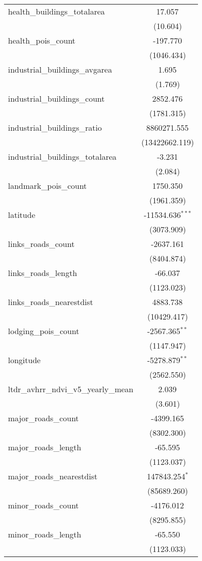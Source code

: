 \begin{table}[!htbp]
\begin{tabular}{@{\extracolsep{5pt}}lc}
 health_buildings_totalarea & 17.057$^{}$ \\
  & (10.604) \\
 health_pois_count & -197.770$^{}$ \\
  & (1046.434) \\
 industrial_buildings_avgarea & 1.695$^{}$ \\
  & (1.769) \\
 industrial_buildings_count & 2852.476$^{}$ \\
  & (1781.315) \\
 industrial_buildings_ratio & 8860271.555$^{}$ \\
  & (13422662.119) \\
 industrial_buildings_totalarea & -3.231$^{}$ \\
  & (2.084) \\
 landmark_pois_count & 1750.350$^{}$ \\
  & (1961.359) \\
 latitude & -11534.636$^{***}$ \\
  & (3073.909) \\
 links_roads_count & -2637.161$^{}$ \\
  & (8404.874) \\
 links_roads_length & -66.037$^{}$ \\
  & (1123.023) \\
 links_roads_nearestdist & 4883.738$^{}$ \\
  & (10429.417) \\
 lodging_pois_count & -2567.365$^{**}$ \\
  & (1147.947) \\
 longitude & -5278.879$^{**}$ \\
  & (2562.550) \\
 ltdr_avhrr_ndvi_v5_yearly_mean & 2.039$^{}$ \\
  & (3.601) \\
 major_roads_count & -4399.165$^{}$ \\
  & (8302.300) \\
 major_roads_length & -65.595$^{}$ \\
  & (1123.037) \\
 major_roads_nearestdist & 147843.254$^{*}$ \\
  & (85689.260) \\
 minor_roads_count & -4176.012$^{}$ \\
  & (8295.855) \\
 minor_roads_length & -65.550$^{}$ \\
  & (1123.033) \\

\end{tabular}
\end{table}
